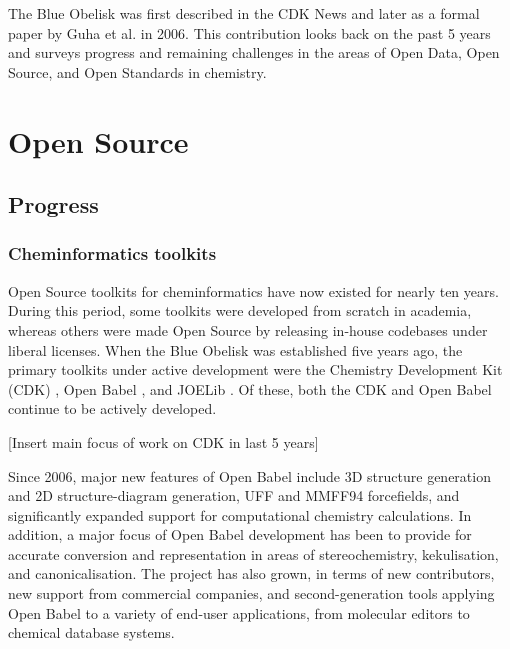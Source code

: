 \documentclass[10pt]{bmc_article}
\newenvironment{bmcformat}{\begin{raggedright}\baselineskip20pt\sloppy\setboolean{publ}{false}}{\end{raggedright}\baselineskip20pt\sloppy}
\begin{document}
\begin{bmcformat}
The Blue Obelisk was first described in the CDK News \cite{CDKNewsBO} and
later as a formal paper by Guha et al.\cite{Guha2006} in
2006. This
contribution looks back on the past 5 years and surveys progress and
remaining challenges in the areas of Open Data, Open Source, and Open
Standards in chemistry.

\section*{Open Source}
  \subsection*{Progress}

\subsubsection*{Cheminformatics toolkits}

Open Source toolkits for cheminformatics have now existed for nearly
ten years. During this period, some toolkits were developed from
scratch in academia, whereas others were made Open Source by releasing in-house
codebases under liberal licenses. When the Blue Obelisk was
established five years ago, the primary toolkits under active development
were the Chemistry Development Kit (CDK)
\cite{Steinbeck2003, Steinbeck2006}, Open Babel \cite{WebOpenBabel},
and JOELib \cite{WebJOELib}. Of these, both the CDK and Open Babel
continue to be actively developed.

[Insert main focus of work on CDK in last 5 years]

Since 2006, major new features of Open Babel include 3D structure
generation and 2D structure-diagram generation, UFF and MMFF94
forcefields, and significantly expanded support for computational
chemistry calculations. In addition, a major focus of Open Babel development
has been to provide for accurate conversion and representation in
areas of stereochemistry, kekulisation, and canonicalisation. The
project has also grown, in terms of new contributors, new support from
commercial companies, and second-generation tools applying Open Babel
to a variety of end-user applications, from molecular editors to
chemical database systems.


\end{bmcformat}
\end{document}
